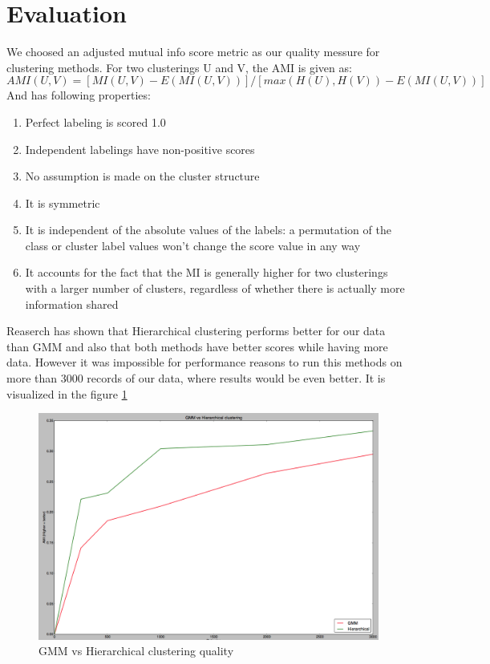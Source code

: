 \section{Evaluation}
We choosed an adjusted mutual info score metric as our quality messure for
clustering methods. For two clusterings U and V, the AMI is given as:
$$ AMI(U, V) = [MI(U, V) - E(MI(U, V))] / [max(H(U), H(V)) - E(MI(U, V))] $$
And has following properties:
\begin{enumerate}
\item Perfect labeling is scored 1.0
\item Independent labelings have non-positive scores
\item No assumption is made on the cluster structure
\item It is symmetric
\item It is independent of the absolute values of the labels: a permutation of
      the class or cluster label values won’t change the score value in any way
\item It accounts for the fact that the MI is generally higher for two
      clusterings with a larger number of clusters, regardless of whether there
      is actually more information shared
\end{enumerate}

Reaserch has shown that Hierarchical clustering performs better for our data
than GMM and also that both methods have better scores while having more data.
However it was impossible for performance reasons to run this methods on more
than 3000 records of our data, where results would be even better. It is
visualized in the figure \ref{fig:scores}
\begin{figure}[!tbh]
  \centering
  \includegraphics[width=1.0\textwidth]{figures/scores}
  \caption{GMM vs Hierarchical clustering quality}
  \label{fig:scores}
\end{figure}
